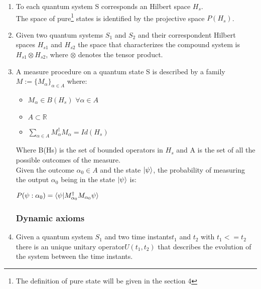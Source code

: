 \documentclass{article}
\begin{document}
\begin{enumerate}
	\item To each quantum system S corresponds an Hilbert space $H_s$.\\
	      The space of pure\footnote{The definition of pure state will
		      be given in the section 4}
	      states is identified by the projective space $P(H_s)$.

	\item Given two quantum systems $S_1$ and $S_2$ and their correspondent
	      Hilbert spaces $H_{s1}$ and $H_{s2}$ the space that characterizes the
	      compound system is $H_{s1} \otimes H_{s2}$, where $\otimes$ denotes
	      the tensor product.

	\item A measure procedure on a quantum state S is described
	      by a family \\  $M := \{M_\alpha \}_{\alpha\in A}$ where:

	      \begin{itemize}
		      \item $M_\alpha \in B(H_s) $ $ \forall \alpha \in A$
		      \item $A \subset \mathbb{R}$
		      \item $\sum_{\alpha \in A} M_\alpha^\dag M_\alpha = Id(H_s)$
	      \end{itemize}

	      Where B(Hs) is the set of bounded operators in $H_s$ and A is the
	      set of all the possible outcomes of the measure.\\
	      Given the outcome $\alpha_0 \in A$ and the state $\ket{\psi}$,
	      the probability
	      of measuring the output $\alpha_0$ being in the state $\ket{\psi}$
	      is:
	      \begin{center}
		      $P(\psi : \alpha_0) = \braket{\psi|M_{\alpha_0}^\dag M_{\alpha_0}\psi}$

	      \end{center}


	      \subsubsection{Dynamic axioms}


	\item Given a quantum system $S_1$ and two time instants$ t_1$ and $t_2$
	      with $t_1<=t_2$ there is an unique unitary operator$U(t_1,t_2)$ that
	      describes the evolution of the system between the time instants.


\end{enumerate}
\end{document}
